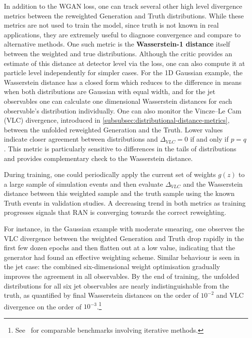 {{        In addition to the WGAN loss, one can track several other high level divergence metrics between the reweighted Generation and Truth distributions.
        While these metrics are not used to train the model, since truth is not known in real applications, they are extremely useful to diagnose convergence and compare to alternative methods.
        One such metric is the \textbf{Wasserstein-1 distance} itself between the weighted and true distributions.
        Although the critic provides an estimate of this distance at detector level via the loss, one can also compute it at particle level independently for simpler cases.
        For the 1D Gaussian example, the Wasserstein distance has a closed form which reduces to the difference in means when both distributions are Gaussian with equal width, and for the jet observables one can calculate one dimensional Wasserstein distances for each observable’s distribution individually.
        One can also monitor the Vincze–Le Cam (VLC) divergence, introduced in \cref{subsubsec:distributional-distance-metrics}, between the unfolded reweighted Generation and the Truth.
        Lower values indicate closer agreement between distributions and $\Delta_{VLC}=0$ if and only if $p=q$.
        This metric is particularly sensitive to differences in the tails of distributions and provides complementary check to the Wasserstein distance.
        
        During training, one could periodically apply the current set of weights $g(z)$ to a large sample of simulation events and then evaluate $\Delta_{VLC}$ and the Wasserstein distance between this weighted sample and the truth sample using the known Truth events in validation studies.
        A decreasing trend in both metrics as training progresses signals that RAN is converging towards the correct reweighting.
        
        For instance, in the Gaussian example with moderate smearing, one observes the VLC divergence between the weighted Generation and Truth drop rapidly in the first few dozen epochs and then flatten out at a low value, indicating that the generator had found an effective weighting scheme.
        Similar behaviour is seen in the jet case: the combined six-dimensional weight optimisation gradually improves the agreement in all observables.
        By the end of training, the unfolded distributions for all six jet observables are nearly indistinguishable from the truth, as quantified by final Wasserstein distances on the order of $10^{-2}$ and VLC divergence on the order of $10^{-3}$.\footnote{See~\cite{andreassen_omnifold_2020} for comparable benchmarks involving iterative methods.}
        
}}
